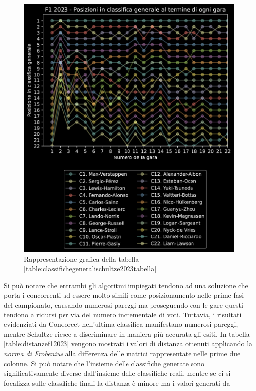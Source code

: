 \documentclass[12pt,a4paper,openright,twoside]{book}
\begin{document}
\begin{figure}[H]
    \centering
     \includegraphics[width=\linewidth]{figures/schultzestandings2023.pdf}
     \caption{Rappresentazione grafica della tabella \ref{table:classifichegeneralischultze2023tabella} }
     \label{fig:classifichegeneralischultze2023figura}
 \end{figure}
 Si può notare che entrambi gli algoritmi impiegati tendono ad una soluzione che porta i concorrenti ad essere
 molto simili come posizionamento nelle prime fasi del campionato, causando numerosi pareggi ma proseguendo con le gare
 questi tendono a ridursi per via del numero incrementale di voti. Tuttavia, i risultati evidenziati da Condorcet 
 nell'ultima classifica manifestano numerosi pareggi, mentre Schultze riesce a discriminare in maniera più accurata
 gli esiti.
 In tabella \ref{table:distanzef12023} vengono mostrati i valori di distanza ottenuti applicando la 
 \textit{norma di Frobenius} alla differenza delle matrici rappresentate nelle prime due colonne.
 Si può notare che l'insieme delle classifiche generate sono significativamente diverse dall'insieme delle classifiche reali,
 mentre se ci si focalizza sulle classifiche finali la distanza è minore ma i valori generati da 
\end{document}
